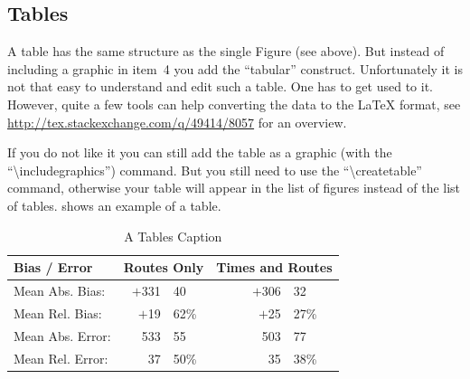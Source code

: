 \documentclass[numbered]{ivt-style/standard}\usepackage[]{graphicx}\usepackage[]{xcolor}
\providecommand{\ivthline}{}
\begin{document}
\subsection{Tables} \label{sec:compStructs-Tables}

A table has the same structure as the single Figure (see above). But
instead of including a graphic in item~4 you add the ``tabular''
construct.
Unfortunately it is not that easy to understand and edit such a table. One has
to get used to it.
However, quite a few tools can help converting the data
to the \LaTeX{} format,
see \url{http://tex.stackexchange.com/q/49414/8057}
for an overview.

If you do not like it you can still add the table
as a graphic (with the ``\textbackslash{}includegraphics'') command.
But you still need
to use the ``\textbackslash{}createtable'' command,
otherwise your table will appear
in the list of figures instead of the list of tables.
 shows an example of a table.

\begin{table}[!ht]
\caption{A Tables  Caption}
\label{tab:labelOfTheTable}%

\begin{tabular}[c]{lr@{.}lcr@{.}l}
    \toprule
    Bias / Error     & \multicolumn{2}{c}{Routes Only} &
\multicolumn{3}{c}{Times and Routes} \\
    \midrule
    Mean Abs. Bias:  & $+$331&40                        && $+$306&32
                         \\
    Mean Rel. Bias:  &  $+$19&62\%                      &&  $+$25&27\%
                         \\
    \midrule
    Mean Abs. Error: &    533&55                        &&    503&77
                         \\
    Mean Rel. Error: &     37&50\%                      &&     35&38\%
                         \\
    \bottomrule
  \end{tabular}

\ivthline
\end{table}




\end{document}
